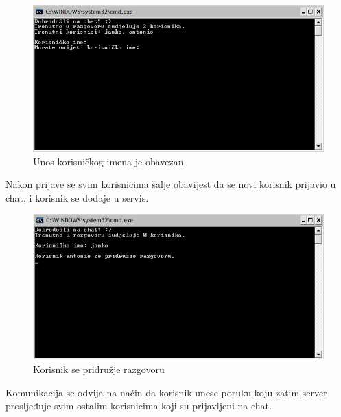 \documentclass[10pt,a4paper,onecolumn,titlepage]{article}
\begin{document}
\begin{figure}[!ht]
\begin{minipage}{\textwidth}
\centering
\includegraphics[width=\textwidth]{images/username_required.jpg}
\caption{Unos korisničkog imena je obavezan}
\end{minipage}
\end{figure}

Nakon prijave se svim korisnicima šalje obavijest da se novi korisnik prijavio
u chat, i korisnik se dodaje u servis.

\begin{figure}[!ht]
\begin{minipage}{\textwidth}
\centering
\includegraphics[width=\textwidth]{images/joining_notification.jpg}
\caption{Korisnik se pridružje razgovoru}
\end{minipage}
\end{figure}

Komunikacija se odvija na način da korisnik unese poruku koju zatim server prosljeđuje svim ostalim korisnicima koji su prijavljeni na chat.

\newpage
\end{document}
